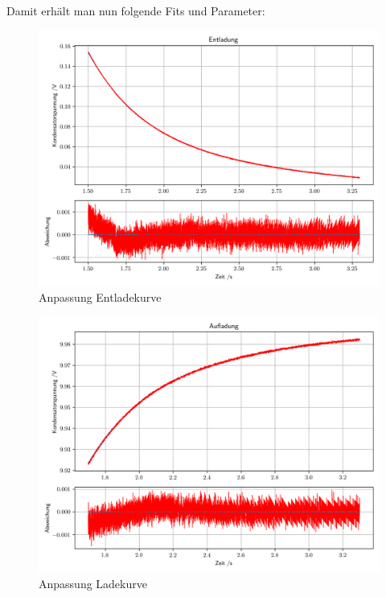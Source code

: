 \documentclass[12pt,twoside,a4paper]{scrartcl}
\begin{document}
				Damit erhält man nun folgende Fits und Parameter:

				\begin{figure}[H]
					\centering
					\includegraphics[width = 0.8 \textwidth]{Plots/Capacitor/CapacitorEntladung.png}
					\caption{Anpassung Entladekurve}
				\end{figure}
				\begin{figure}[H]
					\centering
					\includegraphics[width = 0.8 \textwidth]{Plots/Capacitor/CapacitorAufladung.png}
					\caption{Anpassung Ladekurve}
				\end{figure}
\end{document}
